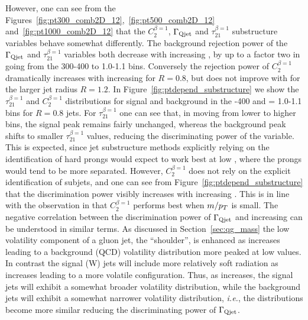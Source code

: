 However, one can see from the Figures~\ref{fig:pt300_comb2D_12},~\ref{fig:pt500_comb2D_12}
and~\ref{fig:pt1000_comb2D_12} that the $C_2^{\beta=1}$, $\Gamma_{\rm Qjet}$ and
$\tau_{21}^{\beta=1}$ substructure variables behave somewhat
differently. The background rejection power of the $\Gamma_{\rm Qjet}$ and
$\tau_{21}^{\beta=1}$ variables both decrease with increasing \pt, by
up to a factor two in going from the 300-400 \GeV to
1.0-1.1 \TeV bins. Conversely the rejection power of $C_2^{\beta=1}$
dramatically increases with increasing \pt for $R=0.8$, but does not
improve with \pt for the larger jet radius $R=1.2$. In Figure~\ref{fig:ptdepend_substructure} we show the
$\tau_{21}^{\beta=1}$ and $C_2^{\beta=1}$ distributions for signal and background in the -400 \GeV and \pt = 1.0-1.1 \TeV bins for $R=0.8$ jets. For
$\tau_{21}^{\beta=1}$ one can see that, in moving from  lower to 
higher \pt bins, the signal peak remains fairly unchanged, whereas the
background peak shifts to smaller $\tau_{21}^{\beta=1}$ values,
reducing the discriminating power of the variable. This is expected,
since jet substructure methods explicitly relying on the identification of hard
prongs would expect to work best at low \pt, where the prongs would
tend to be more separated. However, $C_2^{\beta=1}$ does not rely on
the explicit identification of subjets, and one can see from
Figure~\ref{fig:ptdepend_substructure} that the discrimination power
visibly increases with increasing \pt. This is in line with the
observation in \cite{Larkoski:2013eya} that $C_2^{\beta=1}$ performs best when $m/p_T$ is small.
The negative correlation between the discrimination power of $\Gamma_{\rm Qjet}$ and increasing
\pt can be understood in similar terms.  As discussed in Section~\ref{sec:qg_mass} the low volatility
component of a gluon jet, the ``shoulder'', is enhanced as \pt increases leading to a background (QCD)
volatility distribution more peaked at low values.  In contrast the signal (W) jets will include more relatively soft 
radiation as \pt increases leading to a more volatile configuration. 
Thus, as \pt increases, the signal jets will exhibit a somewhat broader volatility distribution, while
the background jets will exhibit a somewhat narrower volatility distribution, \textit{i.e.}, the
distributions become more similar reducing the discriminating power of $\Gamma_{\rm Qjet}$. 

